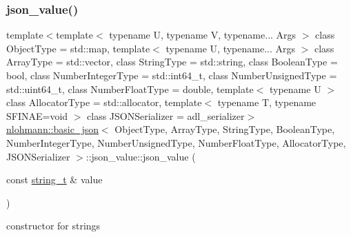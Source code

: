 \subsubsection{\texorpdfstring{json\+\_\+value()}{json\_value()}\hspace{0.1cm}{\footnotesize\ttfamily [7/12]}}
{\footnotesize\ttfamily template$<$template$<$ typename U, typename V, typename... Args $>$ class Object\+Type = std\+::map, template$<$ typename U, typename... Args $>$ class Array\+Type = std\+::vector, class String\+Type  = std\+::string, class Boolean\+Type  = bool, class Number\+Integer\+Type  = std\+::int64\+\_\+t, class Number\+Unsigned\+Type  = std\+::uint64\+\_\+t, class Number\+Float\+Type  = double, template$<$ typename U $>$ class Allocator\+Type = std\+::allocator, template$<$ typename T, typename S\+F\+I\+N\+A\+E=void $>$ class J\+S\+O\+N\+Serializer = adl\+\_\+serializer$>$ \\
\hyperlink{classnlohmann_1_1basic__json}{nlohmann\+::basic\+\_\+json}$<$ Object\+Type, Array\+Type, String\+Type, Boolean\+Type, Number\+Integer\+Type, Number\+Unsigned\+Type, Number\+Float\+Type, Allocator\+Type, J\+S\+O\+N\+Serializer $>$\+::json\+\_\+value\+::json\+\_\+value (\begin{DoxyParamCaption}\item[{const \hyperlink{classnlohmann_1_1basic__json_a61f8566a1a85a424c7266fb531dca005}{string\+\_\+t} \&}]{value }\end{DoxyParamCaption})\hspace{0.3cm}{\ttfamily [inline]}}



constructor for strings 

\mbox{\label{unionnlohmann_1_1basic__json_1_1json__value_ab9c8696a9477ec8a9bce79dec04ef418}} 

